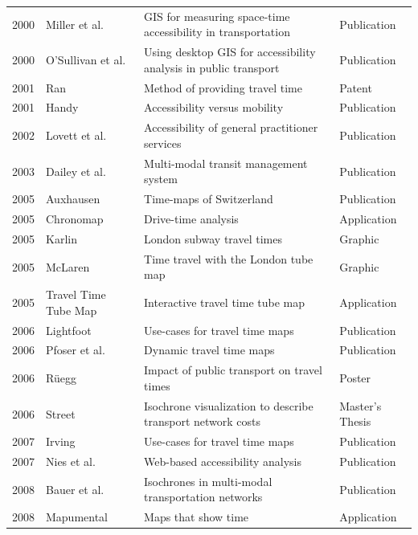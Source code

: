 \begin{table}[htp]
\begin{tabular}{r|l|l|l}
      2000 & Miller et al. \cite{miller2000gis} & GIS for measuring space-time accessibility in transportation & Publication \\
      2000 & O'Sullivan et al. \cite{o2000using} & Using desktop GIS for accessibility analysis in public transport  & Publication  \\
      2001 & Ran \cite{ran2001method} &  Method of providing travel time  & Patent \\
      2001 & Handy \cite{handy2002accessibility} & Accessibility versus mobility & Publication \\
      2002 & Lovett et al. \cite{lovett2002car} & Accessibility of general practitioner services  & Publication  \\
      2003 & Dailey et al. \cite{dailey2003design} &  Multi-modal transit management system & Publication  \\
      2005 & Auxhausen \cite{axhausen2005zeitkarten} & Time-maps of Switzerland  & Publication  \\
      2005 & Chronomap \cite{Chronomap} & Drive-time analysis  & Application  \\
      2005 & Karlin \cite{Karlin2005}  & London subway travel times  & Graphic \\
      2005 & McLaren \cite{McLaren2005} & Time travel with the London tube map  & Graphic  \\
      2005 & Travel Time Tube Map \cite{Carden2006} & Interactive travel time tube map  & Application  \\
      2006 & Lightfoot \cite{Lightfoot2006} & Use-cases for travel time maps  &  Publication  \\
      2006 & Pfoser et al. \cite{pfoser2006dynamic} &  Dynamic travel time maps & Publication  \\
      2006 & Rüegg \cite{Ruegg2006} & Impact of public transport on travel times  & Poster \\
      2006 & Street \cite{street2006timecontours} & Isochrone visualization to describe transport network costs  & Master's Thesis  \\
      2007 & Irving \cite{Irving2007} & Use-cases for travel time maps  & Publication  \\
      2007 & Nies et al. \cite{neis2007webbasierte} & Web-based accessibility analysis  & Publication  \\
      2008 & Bauer et al. \cite{bauer2008computing} & Isochrones in multi-modal transportation networks  & Publication  \\
      2008 & Mapumental \cite{Mapumental}  &  Maps that show time & Application  \\

\end{tabular}
\end{table}
